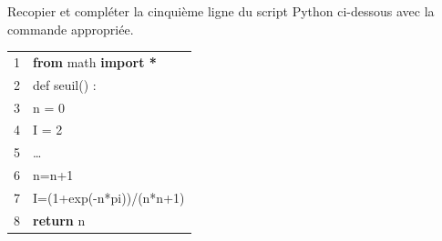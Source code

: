\begin{enumerate}
Recopier et compléter la cinquième ligne du script Python ci-dessous avec la
commande appropriée.
\begin{center}
\begin{tabular}{|l l|}\hline
1 &\textbf{from} math \textbf{import *}\\
2 &def seuil() :\\
3 &\quad n = 0\\
4 &\quad I = 2\\
5 &\quad \ldots\\
6 &\quad \qquad n=n+1\\
7 &\quad \qquad I=(1+exp(-n*pi))/(n*n+1)\\
8 & \textbf{return} n\\ \hline
\end{tabular}
\end{center}

\end{enumerate}
